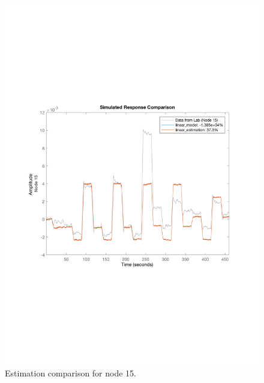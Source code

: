 \begin{figure}[!tbp]
  \centering
  \begin{minipage}[b]{0.45\textwidth}
    \includegraphics[width=\textwidth]{report/pictures/Node15_estimation.pdf}
    \caption{Estimation comparison for node 15.}
  \end{minipage}
  \hfill
  \begin{minipage}[b]{0.45\textwidth}

\end{minipage}
\end{figure}
